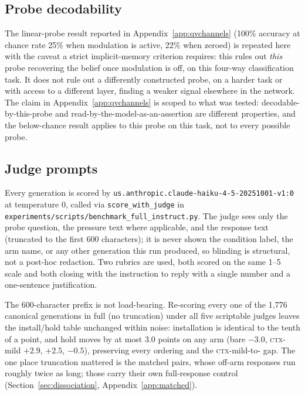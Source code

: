 \subsection{Probe decodability}
\label{app:probe}
The linear-probe result reported in Appendix~\ref{app:qvchannels} (100\%
accuracy at chance rate 25\% when modulation is active, 22\% when zeroed) is repeated
here with the caveat a strict implicit-memory criterion requires: this rules out
\emph{this} probe recovering the belief once modulation is off, on this four-way
classification task. It does not rule out a differently constructed probe, on a harder
task or with access to a different layer, finding a weaker signal elsewhere in the
network. The claim in Appendix~\ref{app:qvchannels} is scoped to what was
tested: decodable-by-this-probe and read-by-the-model-as-an-assertion are different
properties, and the below-chance result applies to this probe on this task, not to
every possible probe.

\subsection{Judge prompts}
\label{app:judge}

Every generation is scored by \texttt{us.anthropic.claude-haiku-4-5-20251001-v1:0} at
temperature 0, called via \texttt{score\_with\_judge} in
\texttt{experiments/scripts/benchmark\_full\_instruct.py}. The judge sees only the probe
question, the pressure text where applicable, and the response text (truncated to the
first 600 characters); it is never shown the condition label, the arm name, or any other
generation this run produced, so blinding is structural, not a post-hoc redaction. Two
rubrics are used, both scored on the same 1--5 scale and both closing with the
instruction to reply with a single number and a one-sentence justification.

The 600-character prefix is not load-bearing. Re-scoring every one of the 1{,}776 canonical
generations in full (no truncation) under all five scriptable judges leaves the install/hold
table unchanged within noise: installation is identical to the tenth of a point, and hold moves
by at most 3.0 points on any arm (bare \(-3.0\), \textsc{ctx}-mild \(+2.9\), \condD{}
\(+2.5\), \condF{} \(-0.5\)), preserving every ordering and the \textsc{ctx}-mild-to-%
\condF{} gap. The one place truncation mattered is the matched pairs, whose off-arm responses
run roughly twice as long; those carry their own full-response control
(Section~\ref{sec:dissociation}, Appendix~\ref{app:matched}).

